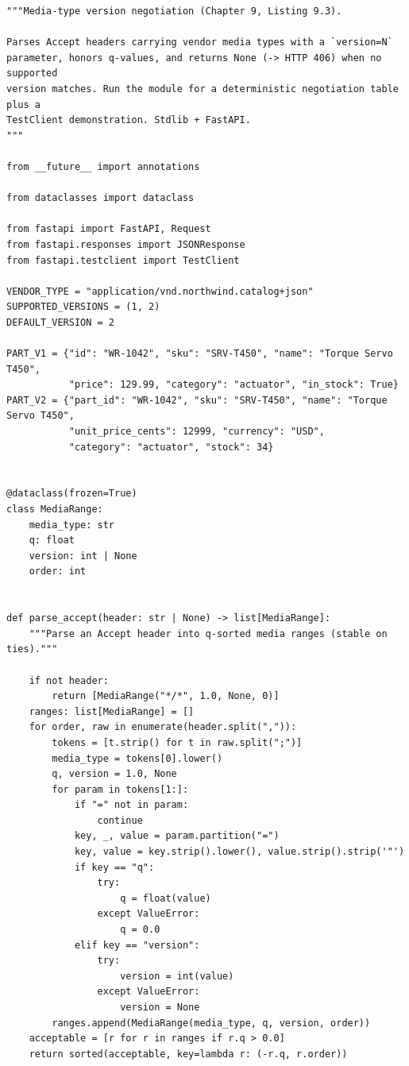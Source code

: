\begin{verbatim}
"""Media-type version negotiation (Chapter 9, Listing 9.3).

Parses Accept headers carrying vendor media types with a `version=N`
parameter, honors q-values, and returns None (-> HTTP 406) when no supported
version matches. Run the module for a deterministic negotiation table plus a
TestClient demonstration. Stdlib + FastAPI.
"""

from __future__ import annotations

from dataclasses import dataclass

from fastapi import FastAPI, Request
from fastapi.responses import JSONResponse
from fastapi.testclient import TestClient

VENDOR_TYPE = "application/vnd.northwind.catalog+json"
SUPPORTED_VERSIONS = (1, 2)
DEFAULT_VERSION = 2

PART_V1 = {"id": "WR-1042", "sku": "SRV-T450", "name": "Torque Servo T450",
           "price": 129.99, "category": "actuator", "in_stock": True}
PART_V2 = {"part_id": "WR-1042", "sku": "SRV-T450", "name": "Torque Servo T450",
           "unit_price_cents": 12999, "currency": "USD",
           "category": "actuator", "stock": 34}


@dataclass(frozen=True)
class MediaRange:
    media_type: str
    q: float
    version: int | None
    order: int


def parse_accept(header: str | None) -> list[MediaRange]:
    """Parse an Accept header into q-sorted media ranges (stable on ties)."""

    if not header:
        return [MediaRange("*/*", 1.0, None, 0)]
    ranges: list[MediaRange] = []
    for order, raw in enumerate(header.split(",")):
        tokens = [t.strip() for t in raw.split(";")]
        media_type = tokens[0].lower()
        q, version = 1.0, None
        for param in tokens[1:]:
            if "=" not in param:
                continue
            key, _, value = param.partition("=")
            key, value = key.strip().lower(), value.strip().strip('"')
            if key == "q":
                try:
                    q = float(value)
                except ValueError:
                    q = 0.0
            elif key == "version":
                try:
                    version = int(value)
                except ValueError:
                    version = None
        ranges.append(MediaRange(media_type, q, version, order))
    acceptable = [r for r in ranges if r.q > 0.0]
    return sorted(acceptable, key=lambda r: (-r.q, r.order))



\end{verbatim}
